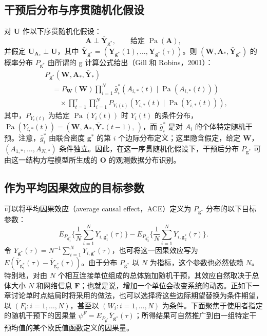 \subsection{干预后分布与序贯随机化假设}

对 $\mathbf U$ 作以下序贯随机化假设：
\begin{equation}
 \mathbf A\perp\bar{\mathbf Y}_{\mathbf g^*},\qquad
 \text{给定 }\operatorname{Pa}(\mathbf A),
 \tag{20.4}
\end{equation}
并假定 $\mathbf U_{\mathbf A_*}\perp\mathbf U$，其中 $\bar{\mathbf Y}_{\mathbf g^*}=(\mathbf Y_{\mathbf g^*}(1),\ldots,\mathbf Y_{\mathbf g^*}(\tau))$。则 $(\mathbf W,\mathbf A_*,\bar{\mathbf Y}_{\mathbf g^*})$ 的概率分布 $P_{\mathbf g^*}$ 由所谓的 g 计算公式给出（Gill 和 Robins，2001）：
\[
\begin{aligned}
 &P_{\mathbf g^*}(\mathbf W,\mathbf A_*,\bar{\mathbf Y}_*)\\
 &\quad=P_{\mathbf W}(\mathbf W)\prod_{i=1}^N
 \bar g_i^*(A_{i,*}(t)\mid\operatorname{Pa}(A_{i,*}(t)))\\
 &\qquad{}\times\prod_{t=1}^\tau\prod_{i=1}^N
 P_{Y_i(t)}(Y_{i,*}(t)\mid\operatorname{Pa}(Y_{i,*}(t))),
\end{aligned}
\]
其中，$P_{Y_i(t)}$ 为给定 $\operatorname{Pa}(Y_i(t))$ 时 $Y_i(t)$ 的条件分布，$\operatorname{Pa}(Y_{i,*}(t))=(\mathbf W,\mathbf A_*,\bar{\mathbf Y}_*(t-1),\,)$，而 $\bar g_i^*$ 是对 $A_i$ 的个体特定随机干预。注意，$\bar g_i^*$ 由联合密度 $\mathbf g^*$ 的第 $i$ 个边际分布定义；这里隐含假定，给定 $\mathbf W$，$(A_{1,*},\ldots,A_{N,*})$ 条件独立。因此，在这一序贯随机化假设下，干预后分布 $P_{\mathbf g^*}$ 可由这一结构方程模型所生成的 $\mathbf O$ 的观测数据分布识别。

\subsection{作为平均因果效应的目标参数}

可以将平均因果效应（average causal effect，ACE）定义为 $P_{\mathbf g^*}$ 分布的以下目标参数：
\[
 E_{P_{\mathbf g_1^*}}\biggl\{\frac1N\sum_{i=1}^NY_{i,\mathbf g_1^*}(\tau)\biggr\}
 -E_{P_{\mathbf g_2^*}}\biggl\{\frac1N\sum_{i=1}^NY_{i,\mathbf g_2^*}(\tau)\biggr\}.
\]
令 $\bar Y_{\mathbf g^*}(\tau)=N^{-1}\sum_{i=1}^NY_{i,\mathbf g^*}(\tau)$，也可将这一因果效应写为 $E(\bar Y_{\mathbf g_1^*}(\tau)-\bar Y_{\mathbf g_2^*}(\tau))$。由于分布 $P_{\mathbf g^*}$ 以 $N$ 为指标，这个参数也必然依赖 $N$。特别地，对由 $N$ 个相互连接单位组成的总体施加随机干预，其效应自然取决于总体大小 $N$ 和网络信息 $\mathbf F$；也就是说，增加一个单位会改变系统的动态。正如下一章讨论单时点结局时将采用的做法，也可以选择将这些边际期望替换为条件期望，以 $(F_i:i=1,\ldots,N)$，甚至以 $(W_i:i=1,\ldots,N)$ 为条件。下面聚焦于使用者指定的随机干预下的因果量 $\psi^F=E_{P_{\mathbf g^*}}\bar Y_{\mathbf g^*}(\tau)$；所得结果可自然推广到由一组特定干预均值的某个欧氏值函数定义的因果量。

